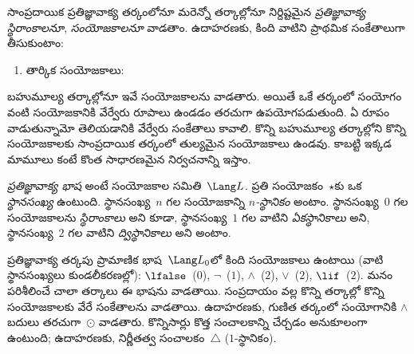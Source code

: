 \documentclass[../../../include/open-logic-section]{subfiles}
\begin{document}


సాంప్రదాయిక ప్రతిజ్ఞావాక్య తర్కంలోనూ మరెన్నో తర్కాల్లోనూ
నిర్దిష్టమైన \emph{ప్రతిజ్ఞావాక్య స్థిరాంకాలనూ}, \emph{సంయోజకాలనూ}
వాడతాం. ఉదాహరణకు, కింది వాటిని
ప్రాథమిక సంకేతాలుగా తీసుకుంటాం:
\begin{enumerate}
\item తార్కిక సంయోజకాలు:
  \startycommalist
\end{enumerate}

బహుమూల్య తర్కాల్లోనూ ఇవే సంయోజకాలను వాడతారు. అయితే
ఒకే తర్కంలో సంయోగం వంటి సంయోజకానికి వేర్వేరు రూపాలు
ఉండడం తరచుగా ఉపయోగపడుతుంది. ఏ రూపం వాడుతున్నామో తెలియడానికి
వేర్వేరు సంకేతాలు కావాలి. కొన్ని బహుమూల్య తర్కాల్లోని కొన్ని
సంయోజకాలకు సాంప్రదాయిక తర్కంలో తుల్యమైన సంయోజకాలు ఉండవు.
కాబట్టి ఇక్కడ మామూలు కంటే కొంత సాధారణమైన నిర్వచనాన్ని ఇస్తాం.

\begin{defn}
  \emph{ప్రతిజ్ఞావాక్య భాష} అంటే సంయోజకాల సమితి~$\Lang L$.
  ప్రతి సంయోజకం~$\star$కు ఒక \emph{స్థానసంఖ్య} ఉంటుంది.
  స్థానసంఖ్య~$n$ గల సంయోజకాన్ని \emph{$n$-స్థానికం} అంటాం.
  స్థానసంఖ్య~$0$ గల సంయోజకాలను \emph{స్థిరాంకాలు} అని కూడా,
  స్థానసంఖ్య~$1$ గల వాటిని \emph{ఏకస్థానికాలు} అని,
  స్థానసంఖ్య~$2$ గల వాటిని \emph{ద్విస్థానికాలు} అని అంటాం.
\end{defn}

\begin{ex}
  ప్రతిజ్ఞావాక్య తర్కపు ప్రామాణిక భాష~$\Lang L_0$లో కింది
  సంయోజకాలు ఉంటాయి (వాటి స్థానసంఖ్యలు కుండలీకరణల్లో):
  $\lfalse$~($0$),
  $\lnot$~($1$),
  $\land$~($2$),
  $\lor$~($2$),
  $\lif$~($2$). మనం పరిశీలించే చాలా తర్కాలు ఈ భాషను వాడతాయి.
సంప్రదాయం వల్ల కొన్ని తర్కాల్లో కొన్ని సంయోజకాలకు వేరే
  సంకేతాలను వాడతాయి. ఉదాహరణకు, గుణిత తర్కంలో సంయోగానికి
  $\land$ బదులు తరచుగా~$\odot$ వాడతారు. కొన్నిసార్లు కొత్త
  సంచాలకాన్ని చేర్చడం అనుకూలంగా ఉంటుంది; ఉదాహరణకు,
  నిర్ణీతత్వ సంచాలకం~$\triangle$ ($1$-స్థానికం).
\end{ex}
\end{document}
